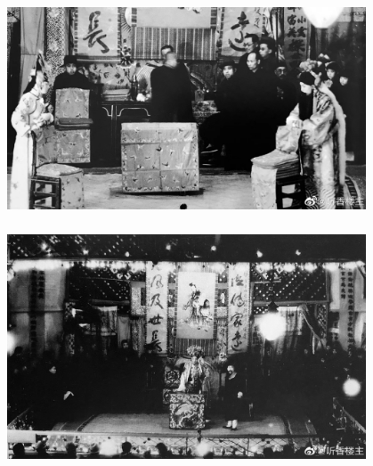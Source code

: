 \documentclass[cjk,slidestop,compress,mathserif,blue]{beamer}
\begin{document}
\frame
{
	\frametitle{}
\begin{figure}[h!]
\centering
\vspace{-0.10in}
\includegraphics[height=0.60\textwidth,width=0.95\textwidth, clip]{Figures/PekOpe_His-5.jpg}
\label{History-5}
\end{figure}
}

\frame
{
	\frametitle{}
\begin{figure}[h!]
\centering
\vspace{-0.10in}
\includegraphics[height=0.60\textwidth,width=0.95\textwidth, clip]{Figures/PekOpe_His-6.jpg}
\label{History-6}
\end{figure}
}
\end{document}

